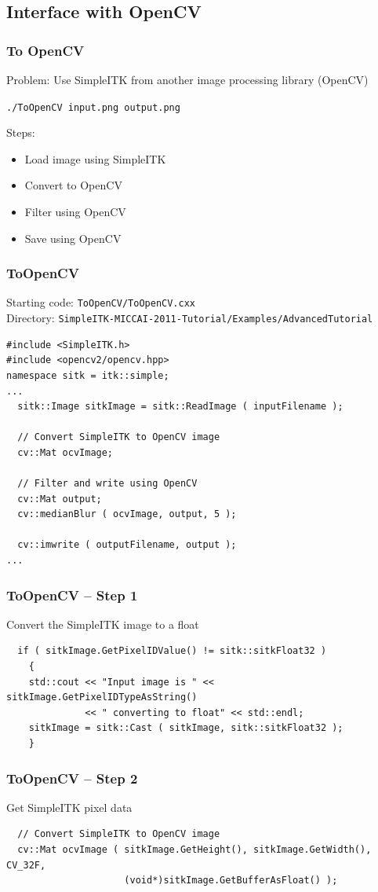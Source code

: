 \subsection{Interface with OpenCV}
\begin{frame}[fragile]
\frametitle{To OpenCV}
Problem: Use SimpleITK from another image processing library (OpenCV)

\texttt{./ToOpenCV input.png output.png}

Steps:
\begin{itemize}
\item Load image using SimpleITK
\item Convert to OpenCV
\item Filter using OpenCV
\item Save using OpenCV
\end{itemize}
\end{frame}


\begin{frame}[fragile]
\frametitle{ToOpenCV}
Starting code: \texttt{ToOpenCV/ToOpenCV.cxx}\\
Directory: \texttt{SimpleITK-MICCAI-2011-Tutorial/Examples/AdvancedTutorial}
\begin{lstlisting}
#include <SimpleITK.h>
#include <opencv2/opencv.hpp>
namespace sitk = itk::simple;
...
  sitk::Image sitkImage = sitk::ReadImage ( inputFilename );

  // Convert SimpleITK to OpenCV image
  cv::Mat ocvImage;

  // Filter and write using OpenCV
  cv::Mat output;
  cv::medianBlur ( ocvImage, output, 5 );

  cv::imwrite ( outputFilename, output );
...
\end{lstlisting}
\end{frame}

\begin{frame}[fragile]
\frametitle{ToOpenCV -- Step 1}
Convert the SimpleITK image to a float
\begin{lstlisting}
  if ( sitkImage.GetPixelIDValue() != sitk::sitkFloat32 )
    {
    std::cout << "Input image is " << sitkImage.GetPixelIDTypeAsString()
              << " converting to float" << std::endl;
    sitkImage = sitk::Cast ( sitkImage, sitk::sitkFloat32 );
    }
\end{lstlisting}
\end{frame}

\begin{frame}[fragile]
\frametitle{ToOpenCV -- Step 2}
Get SimpleITK pixel data
\begin{lstlisting}
  // Convert SimpleITK to OpenCV image
  cv::Mat ocvImage ( sitkImage.GetHeight(), sitkImage.GetWidth(), CV_32F,
                     (void*)sitkImage.GetBufferAsFloat() );
\end{lstlisting}
\end{frame}

